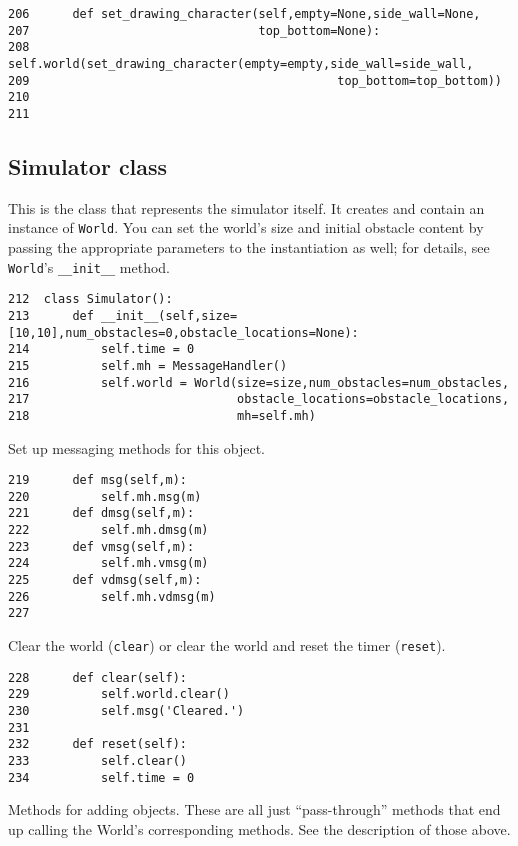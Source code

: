\documentclass[11pt]{tufte-handout}
\begin{document}
\begin{verbatim}
206      def set_drawing_character(self,empty=None,side_wall=None,
207                                top_bottom=None):
208          self.world(set_drawing_character(empty=empty,side_wall=side_wall,
209                                           top_bottom=top_bottom))
210  
211  
\end{verbatim}

\subsection{Simulator class}
\label{sec:org29669c0}

This is the class that represents the simulator itself.  It creates and contain an instance of \texttt{World}.  You can set the world's size and initial  obstacle content by passing the appropriate parameters to the instantiation as well; for details, see \texttt{World}'s \texttt{\_\_init\_\_} method.

\begin{verbatim}
212  class Simulator():
213      def __init__(self,size=[10,10],num_obstacles=0,obstacle_locations=None):
214          self.time = 0
215          self.mh = MessageHandler()
216          self.world = World(size=size,num_obstacles=num_obstacles,
217                             obstacle_locations=obstacle_locations,
218                             mh=self.mh)
\end{verbatim}

Set up messaging methods for this object.
\begin{verbatim}
219      def msg(self,m):
220          self.mh.msg(m)
221      def dmsg(self,m):
222          self.mh.dmsg(m)
223      def vmsg(self,m):
224          self.mh.vmsg(m)
225      def vdmsg(self,m):
226          self.mh.vdmsg(m)
227  
\end{verbatim}

Clear the world (\texttt{clear}) or clear the world  and reset the timer (\texttt{reset}).

\begin{verbatim}
228      def clear(self):
229          self.world.clear()
230          self.msg('Cleared.')
231  
232      def reset(self):
233          self.clear()
234          self.time = 0
\end{verbatim}

Methods for adding objects.  These are all just ``pass-through'' methods that end up calling the World's corresponding methods.  See the description of those above.
\end{document}
